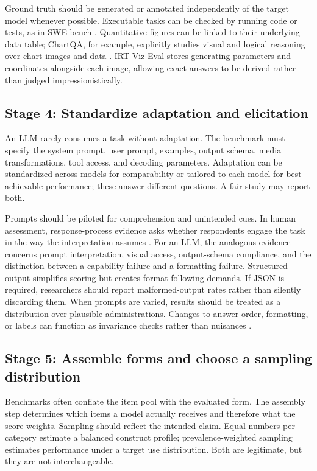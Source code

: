 \documentclass[12pt]{article}
\begin{document}
Ground truth should be generated or annotated independently of the target model whenever possible. Executable tasks can be checked by running code or tests, as in SWE-bench \citep{jimenez2024swebench}. Quantitative figures can be linked to their underlying data table; ChartQA, for example, explicitly studies visual and logical reasoning over chart images and data \citep{masry2022chartqa}. IRT-Viz-Eval stores generating parameters and coordinates alongside each image, allowing exact answers to be derived rather than judged impressionistically.

\subsection{Stage 4: Standardize adaptation and elicitation}

An LLM rarely consumes a task without adaptation. The benchmark must specify the system prompt, user prompt, examples, output schema, media transformations, tool access, and decoding parameters. Adaptation can be standardized across models for comparability or tailored to each model for best-achievable performance; these answer different questions. A fair study may report both.

Prompts should be piloted for comprehension and unintended cues. In human assessment, response-process evidence asks whether respondents engage the task in the way the interpretation assumes \citep{padilla2014response}. For an LLM, the analogous evidence concerns prompt interpretation, visual access, output-schema compliance, and the distinction between a capability failure and a formatting failure. Structured output simplifies scoring but creates format-following demands. If JSON is required, researchers should report malformed-output rates rather than silently discarding them. When prompts are varied, results should be treated as a distribution over plausible administrations. Changes to answer order, formatting, or labels can function as invariance checks rather than nuisances \citep{gupta2024answerorder}.

\subsection{Stage 5: Assemble forms and choose a sampling distribution}

Benchmarks often conflate the item pool with the evaluated form. The assembly step determines which items a model actually receives and therefore what the score weights. Sampling should reflect the intended claim. Equal numbers per category estimate a balanced construct profile; prevalence-weighted sampling estimates performance under a target use distribution. Both are legitimate, but they are not interchangeable.
\end{document}
